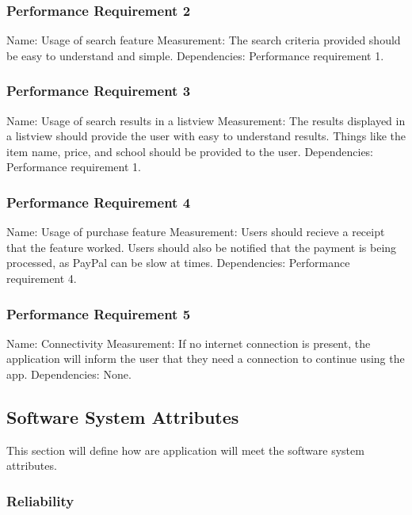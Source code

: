 \documentclass[journal,compsoc, 10pt, draftclsnofoot, onecolumn]{IEEEtran}
\begin{document}
\subsubsection{Performance Requirement 2}
Name: Usage of search feature\newline
Measurement: The search criteria provided should be easy to understand and 
simple.\newline
Dependencies: Performance requirement 1.

\subsubsection{Performance Requirement 3}
Name: Usage of search results in a listview\newline
Measurement: The results displayed in a listview should provide the user with 
easy to understand results. Things like the item name, price, and school should 
be provided to the user.\newline
Dependencies: Performance requirement 1.

\subsubsection{Performance Requirement 4}
Name: Usage of purchase feature\newline
Measurement: Users should recieve a receipt that the feature worked. Users 
should also be notified that the payment is being processed, as PayPal can
be slow at times.\newline 
Dependencies: Performance requirement 4.

\subsubsection{Performance Requirement 5}
Name: Connectivity 
Measurement: If no internet connection is present, the application will inform
the user that they need a connection to continue using the app.
Dependencies: None.

\subsection{Software System Attributes}

This section will define how are application will meet the software system 
attributes.

\subsubsection{Reliability}
\end{document}
